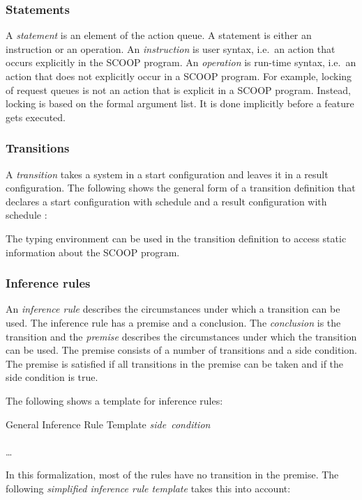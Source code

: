 \subsubsection{Statements}
A \emph{statement} is an element of the action queue. A statement is either an instruction or an operation. An \emph{instruction} is user syntax, i.e.\ an action that occurs explicitly in the SCOOP program. An \emph{operation} is run-time syntax, i.e.\ an action that does not explicitly occur in a SCOOP program. For example, locking of request queues is not an action that is explicit in a SCOOP program. Instead, locking is based on the formal argument list. It is done implicitly before a feature gets executed.

\subsubsection{Transitions}
A \emph{transition} takes a system in a start configuration and leaves it in a result configuration. The following shows the general form of a transition definition that declares a start configuration  with schedule  and a result configuration  with schedule :

\isolatedsinglelinetransition
	{}
	{}

The typing environment  can be used in the transition definition to access static information about the SCOOP program.

\subsubsection{Inference rules}
An \emph{inference rule} describes the circumstances under which a transition can be used. The inference rule has a premise and a conclusion. The \emph{conclusion} is the transition and the \emph{premise} describes the circumstances under which the transition can be used. The premise consists of a number of transitions and a side condition. The premise is satisfied if all transitions in the premise can be taken and if the side condition is true.
\begin{fortechnicalreport}
The following shows a template for inference rules:

\singlelineinferencerule
	{General Inference Rule Template}
	{
		\mbox{\it{side condition}} \\
		 \\
		\ldots \\
	}
	{}
	{}

\end{fortechnicalreport}
In this formalization, most of the rules have no transition in the premise. The following \emph{simplified inference rule template} takes this into account:

